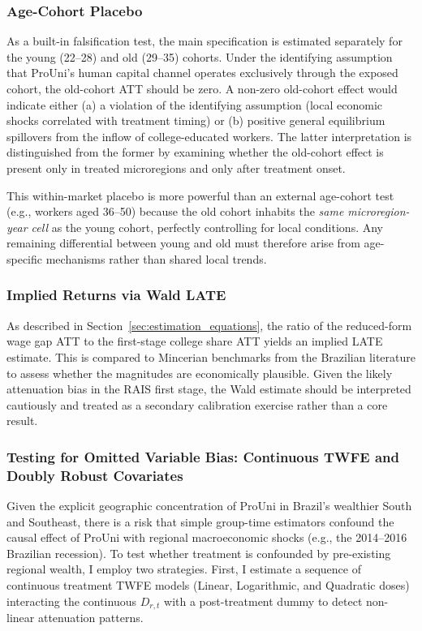 \subsubsection{Age-Cohort Placebo}
As a built-in falsification test, the main specification is estimated separately for the young (22--28) and old (29--35) cohorts. Under the identifying assumption that ProUni's human capital channel operates exclusively through the exposed cohort, the old-cohort ATT should be zero. A non-zero old-cohort effect would indicate either (a) a violation of the identifying assumption (local economic shocks correlated with treatment timing) or (b) positive general equilibrium spillovers from the inflow of college-educated workers. The latter interpretation is distinguished from the former by examining whether the old-cohort effect is present only in treated microregions and only after treatment onset.

This within-market placebo is more powerful than an external age-cohort test (e.g., workers aged 36--50) because the old cohort inhabits the \emph{same microregion-year cell} as the young cohort, perfectly controlling for local conditions. Any remaining differential between young and old must therefore arise from age-specific mechanisms rather than shared local trends.

\subsubsection{Implied Returns via Wald LATE}
As described in Section~\ref{sec:estimation_equations}, the ratio of the reduced-form wage gap ATT to the first-stage college share ATT yields an implied LATE estimate. This is compared to Mincerian benchmarks from the Brazilian literature \cite{BarbosaFilhoPessoa2008, MenezesFilho2001, Card1999} to assess whether the magnitudes are economically plausible. Given the likely attenuation bias in the RAIS first stage, the Wald estimate should be interpreted cautiously and treated as a secondary calibration exercise rather than a core result.

\subsubsection{Testing for Omitted Variable Bias: Continuous TWFE and Doubly Robust Covariates}
\label{sec:robustness_dr}

Given the explicit geographic concentration of ProUni in Brazil's wealthier South and Southeast, there is a risk that simple group-time estimators confound the causal effect of ProUni with regional macroeconomic shocks (e.g., the 2014--2016 Brazilian recession). To test whether treatment is confounded by pre-existing regional wealth, I employ two strategies. First, I estimate a sequence of continuous treatment TWFE models (Linear, Logarithmic, and Quadratic doses) interacting the continuous $D_{r,t}$ with a post-treatment dummy to detect non-linear attenuation patterns. 

